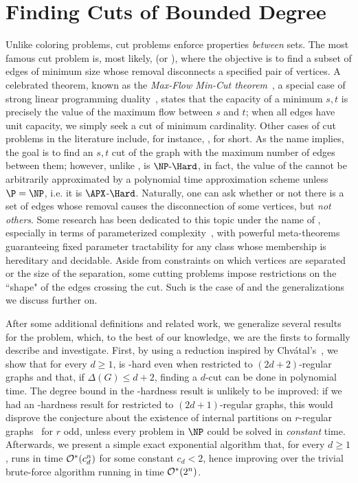 \chapter{Finding Cuts of Bounded Degree}

Unlike coloring problems, cut problems enforce properties \textit{between} sets.
The most famous cut problem is, most likely,  (or ), where the objective is to find a subset of edges of minimum size whose removal disconnects a specified pair of vertices.
A celebrated theorem, known as the \textit{Max-Flow Min-Cut theorem}~\citep{ford_fulkerson}, a special case of strong linear programming duality~\citep{linear_optimization}, states that the capacity of a minimum $s,t$ is precisely the value of the maximum flow between $s$ and $t$; when all edges have unit capacity, we simply seek a cut of minimum cardinality.
Other cases of cut problems in the literature include, for instance, ,  for short.
As the name implies, the goal is to find an $s,t$ cut of the graph with the maximum number of edges between them; however, unlike ,  is $\NPH$, in fact, the value of the cannot be arbitrarily approximated by a polynomial time approximation scheme unless $\P = \NP$, i.e. it is $\APX$-$\Hard$.
Naturally, one can ask whether or not there is a set of edges whose removal causes the disconnection of some vertices, but \textit{not others}.
Some research has been dedicated to this topic under the name of , especially in terms of parameterized complexity~\citep{marx_treewidth_reduction,marx_separation}, with powerful meta-theorems guaranteeing fixed parameter tractability for any class whose membership is hereditary and decidable.
Aside from constraints on which vertices are separated or the size of the separation, some cutting problems impose restrictions on the ``shape" of the edges crossing the cut.
Such is the case of  and the generalizations we discuss further on.

After some additional definitions and related work, we generalize several results for the  problem, which, to the best of our knowledge, we are the firsts to formally describe and investigate.
First, by using a reduction inspired by Chvátal's~\citep{chvatal_matching_cut}, we show that for every $d \geq 1$,  is \NP-hard even when restricted to $(2d+2)$-regular graphs and that, if $\Delta(G) \leq d+2$, finding a $d$-cut can be done in polynomial time. The degree bound in the \NP-hardness result is unlikely to be improved: if we had an \NP-hardness result for  restricted to $(2d+1)$-regular graphs, this would disprove the conjecture about the existence of internal partitions on $r$-regular graphs~\citep{DeVos09,internal_partition_regular6,internal_partition_regular3_4} for $r$ odd, unless every problem in $\NP$ could be solved in \textit{constant} time.
Afterwards, we present a simple exact exponential algorithm that, for every $d \geq 1$, runs in time $\mathcal{O}^*\!\left(c_d^n\right)$ for some constant $c_d < 2$, hence improving over the trivial brute-force algorithm running in time $\mathcal{O}^*\!\left(2^n\right)$.

